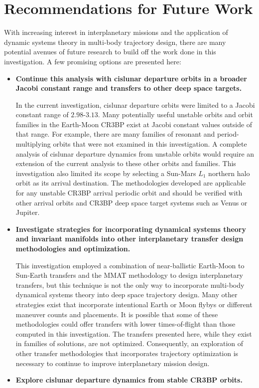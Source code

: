 \section{Recommendations for Future Work}
With increasing interest in interplanetary missions and the application of dynamic systems theory
in multi-body trajectory design, there are many potential avenues of future research to build off
the work done in this investigation. A few promising options are presented here:
\begin{itemize}
    \item   \textbf{Continue this analysis with cislunar departure orbits in a broader Jacobi
            constant range and transfers to other deep space targets.}

            In the current investigation, cislunar departure orbits were limited to a Jacobi
            constant range of $2.98$-$3.13$. Many potentially useful unstable orbits and orbit
            families in the Earth-Moon CR3BP exist at Jacobi constant values outside of that range.
            For example, there are many families of resonant and period-multiplying orbits that
            were not examined in this investigation. A complete analysis of cislunar departure
            dynamics from unstable orbits would require an extension of the current analysis to
            these other orbits and families. This investigation also limited its scope by selecting
            a Sun-Mars $L_{1}$ northern halo orbit as its arrival destination. The methodologies
            developed are applicable for any unstable CR3BP arrival periodic orbit and should be
            verified with other arrival orbits and CR3BP deep space target systems such as Venus or
            Jupiter.
    \item   \textbf{Investigate strategies for incorporating dynamical systems theory and invariant
            manifolds into other interplanetary transfer design methodologies and optimization.}

            This investigation employed a combination of near-ballistic Earth-Moon to Sun-Earth
            transfers and the MMAT methodology to design interplanetary transfers, but this
            technique is not the only way to incorporate multi-body dynamical systems theory into
            deep space trajectory design. Many other strategies exist that incorporate intentional
            Earth or Moon flybys or different maneuver counts and placements. It is possible that
            some of these methodologies could offer transfers with lower times-of-flight than those
            computed in this investigation. The transfers presented here, while they exist in
            families of solutions, are not optimized. Consequently, an exploration of other
            transfer methodologies that incorporates trajectory optimization is necessary to
            continue to improve interplanetary mission design.
    \item   \textbf{Explore cislunar departure dynamics from stable CR3BP orbits.}
    

\end{itemize}
